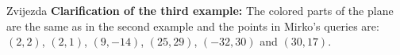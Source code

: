 \begin{statement}[
  problempoints=110,
  timelimit=1 second,
  memorylimit=512 MiB,
]{Zvijezda}
\textbf{Clarification of the third example:}
The colored parts of the plane are the same as in the second example and
the points in Mirko's queries are:
$(2, 2)$, $(2, 1)$, $(9, -14)$, $(25, 29)$,
$(-32, 30)$ and $(30, 17)$.

\end{statement}

